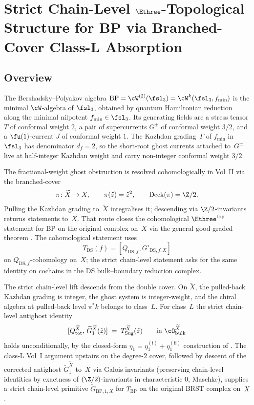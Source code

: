 \chapter{Strict Chain-Level $\Ethree$-Topological Structure for BP via Branched-Cover Class-L Absorption}
\label{chap:bp-chain-level-strict-platonic}

\section*{Overview}
\label{sec:bp-chain-level-overview}

The Bershadsky--Polyakov algebra $\mathrm{BP} = \cW^{(2)}(\fsl_3) = \cW^{k}(\fsl_3, f_{\min})$ is the minimal $\cW$-algebra of $\fsl_3$, obtained by quantum Hamiltonian reduction along the minimal nilpotent $f_{\min} \in \fsl_3$. Its generating fields are a stress tensor $T$ of conformal weight $2$, a pair of supercurrents $G^{\pm}$ of conformal weight $3/2$, and a $\fu(1)$-current $J$ of conformal weight $1$. The Kazhdan grading~$\Gamma$ of $f_{\min}$ in~$\fsl_3$ has denominator $d_f = 2$, so the short-root ghost currents attached to~$G^{\pm}$ live at half-integer Kazhdan weight and carry non-integer conformal weight $3/2$.

The fractional-weight ghost obstruction is resolved cohomologically in Vol~II
\cite[\S\ref*{sec:fractional-ghost-platonic}]{Vol2-fractional-ghost-platonic}
via the branched-cover
\[
 \pi \colon \widetilde X \to X, \qquad \pi(\tilde z) = \tilde z^{2}, \qquad
 \mathrm{Deck}(\pi) = \Z/2.
\]
Pulling the Kazhdan grading to~$\widetilde X$ integralises it; descending via $\Z/2$-invariants returns statements to~$X$. That route closes the cohomological $\Ethree^{\mathrm{top}}$ statement for BP on the original complex on~$X$ via the general good-graded theorem \cite[Theorem~\ref*{thm:E3-topological-DS-general-all-good-graded}]{Vol2-fractional-ghost-platonic}. The cohomological statement uses
\[
T_{\mathrm{DS}}(f)=[Q_{\mathrm{DS},f},G'_{\mathrm{DS},f,X}]
\]
on \(Q_{\mathrm{DS},f}\)-cohomology on~$X$; the strict chain-level
statement asks for the same identity on cochains in the DS
bulk--boundary reduction complex.

The strict chain-level lift descends from the double cover. On $\widetilde X$, the pulled-back Kazhdan grading is integer, the ghost system is integer-weight, and the chiral algebra at pulled-back level $\pi^{\ast} k$ belongs to class~$L$. For class~$L$ the strict chain-level antighost identity
\[
 [Q_{\mathrm{tot}}^{\widetilde X},\, \widetilde G_1^{\widetilde X}(\tilde z)]
 \;=\; T_{\mathrm{Sug}}^{\widetilde X}(\tilde z)
 \qquad\text{in $\cO_{\mathrm{bulk}}^{\widetilde X}$}
\]
holds unconditionally, by the closed-form $\eta_1 = \eta_1^{(\mathrm i)} + \eta_1^{(\mathrm{ii})}$ construction of \cite[Theorem~\ref*{V1-thm:sugawara-antighost-primitive-chain-level}]{Vol1-class-L-antighost}. The class-L Vol~I argument upstairs on the degree-$2$ cover, followed by descent of the corrected antighost $\widetilde G_1^{\widetilde X}$ to~$X$ via Galois invariants (preserving chain-level identities by exactness of $(\Z/2)$-invariants in characteristic $0$, Maschke), supplies a strict chain-level primitive $\widetilde G_{\mathrm{BP},1, X}$ for $T_{\mathrm{BP}}$ on the original BRST complex on~$X$.

